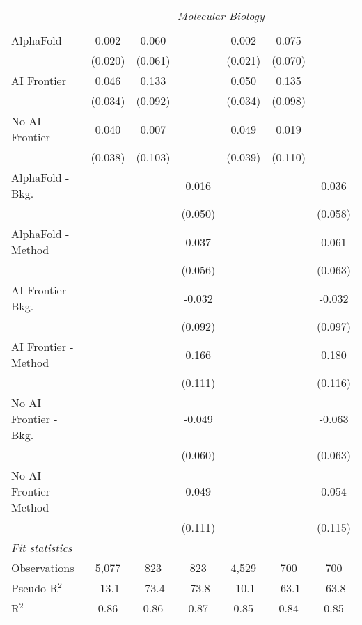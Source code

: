 \begin{tabular}{lcccccc}
 & \multicolumn{6}{c}{\textit{Molecular Biology}} \\ \\
   AlphaFold               & 0.002   & 0.060   &         & 0.002   & 0.075   &   \\   
                           & (0.020) & (0.061) &         & (0.021) & (0.070) &   \\   
   AI Frontier             & 0.046   & 0.133   &         & 0.050   & 0.135   &   \\   
                           & (0.034) & (0.092) &         & (0.034) & (0.098) &   \\   
   No AI Frontier          & 0.040   & 0.007   &         & 0.049   & 0.019   &   \\   
                           & (0.038) & (0.103) &         & (0.039) & (0.110) &   \\   
   AlphaFold - Bkg.        &         &         & 0.016   &         &         & 0.036\\   
                           &         &         & (0.050) &         &         & (0.058)\\   
   AlphaFold - Method      &         &         & 0.037   &         &         & 0.061\\   
                           &         &         & (0.056) &         &         & (0.063)\\   
   AI Frontier - Bkg.      &         &         & -0.032  &         &         & -0.032\\   
                           &         &         & (0.092) &         &         & (0.097)\\   
   AI Frontier - Method    &         &         & 0.166   &         &         & 0.180\\   
                           &         &         & (0.111) &         &         & (0.116)\\   
   No AI Frontier - Bkg.   &         &         & -0.049  &         &         & -0.063\\   
                           &         &         & (0.060) &         &         & (0.063)\\   
   No AI Frontier - Method &         &         & 0.049   &         &         & 0.054\\   
                           &         &         & (0.111) &         &         & (0.115)\\   
   \midrule
   \emph{Fit statistics}\\
   Observations            & 5,077   & 823     & 823     & 4,529   & 700     & 700\\  
   Pseudo R$^2$            & -13.1   & -73.4   & -73.8   & -10.1   & -63.1   & -63.8\\  
   R$^2$                   & 0.86    & 0.86    & 0.87    & 0.85    & 0.84    & 0.85\\  
   

\end{tabular}
